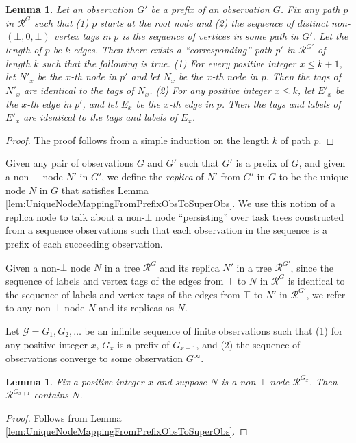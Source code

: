\documentclass[11pt]{article}
\numberwithin{theorem}{section}
\newtheorem{lemma}[theorem]{Lemma}
\begin{document}
\begin{lemma}\label{lem:superObsYieldsSuperTree}
Let an observation $G'$ be a prefix of an observation $G$. Fix any path $p$ in $\mathcal{R}^G$ such that (1) $p$ starts at the root node and (2) the sequence of distinct non-$(\bot,0,\bot)$ vertex tags in $p$ is the sequence of vertices in some path in $G'$. Let the length of $p$ be $k$ edges. 
Then there exists a ``corresponding'' path $p'$ in $\mathcal{R}^{G'}$ of length $k$ such that the following is true. 
(1) For every positive integer $x \leq k+1$, let $N'_x$ be the $x$-th node in $p'$ and let $N_x$ be the $x$-th node in $p$. Then the tags of $N'_x$ are identical to the tags of $N_x$.
(2) For any positive integer $x \leq k$, let $E'_x$ be the $x$-th edge in $p'$, and let $E_x$ be the $x$-th edge in $p$. Then the tags and labels of $E'_x$ are identical to the tags and labels of $E_x$.
\end{lemma}
\begin{proof}
The proof follows from a simple induction on the length $k$ of path $p$. 
\end{proof}

Given any pair of observations $G$ and $G'$ such that $G'$ is a prefix of $G$, and given a non-$\bot$ node $N'$ in $G'$, we define the \emph{replica} of $N'$ from $G'$ in $G$ to be the unique node $N$ in $G$ that satisfies Lemma  \ref{lem:UniqueNodeMappingFromPrefixObsToSuperObs}. We use this notion of a replica node to talk about a non-$\bot$ node ``persisting'' over task trees constructed from a sequence observations such that each observation in the sequence is a prefix of each succeeding observation.

Given a non-$\bot$ node $N$ in a tree $\mathcal{R}^G$ and its replica $N'$ in a tree $\mathcal{R}^{G'}$, since the sequence of labels and vertex tags of the edges from $\top$ to $N$ in $\mathcal{R}^G$ is identical to the sequence of labels and vertex tags of the edges from $\top$ to $N'$ in $\mathcal{R}^{G'}$, we refer to any non-$\bot$ node $N$ and its replicas as $N$.

Let $\mathcal{G} = G_1,G_2,\ldots$ be an infinite sequence of finite observations such that (1) for any positive integer $x$, $G_x$ is a prefix of $G_{x+1}$, and (2) the sequence of observations converge to some observation $G^\infty$.
\begin{lemma}\label{lem:nodePersistsOneHop}
Fix a positive integer $x$ and suppose $N$ is a non-$\bot$ node  $\mathcal{R}^{G_x}$. Then $\mathcal{R}^{G_{x+1}}$ contains $N$.
\end{lemma}
\begin{proof}
Follows from Lemma \ref{lem:UniqueNodeMappingFromPrefixObsToSuperObs}.
\end{proof}
\end{document}
